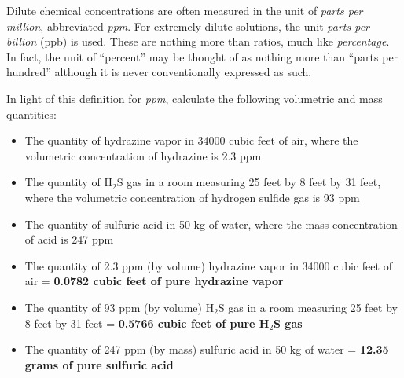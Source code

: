 

Dilute chemical concentrations are often measured in the unit of {\it parts per million}, abbreviated {\it ppm}.  For extremely dilute solutions, the unit {\it parts per billion} (ppb) is used.  These are nothing more than ratios, much like {\it percentage}.  In fact, the unit of ``percent'' may be thought of as nothing more than ``parts per hundred'' although it is never conventionally expressed as such.

\vskip 10pt

In light of this definition for {\it ppm}, calculate the following volumetric and mass quantities:

\begin{itemize}
\item{} The quantity of hydrazine vapor in 34000 cubic feet of air, where the volumetric concentration of hydrazine is 2.3 ppm
\vskip 10pt
\item{} The quantity of H$_{2}$S gas in a room measuring 25 feet by 8 feet by 31 feet, where the volumetric concentration of hydrogen sulfide gas is 93 ppm
\vskip 10pt
\item{} The quantity of sulfuric acid in 50 kg of water, where the mass concentration of acid is 247 ppm 
\end{itemize}







\begin{itemize}
\item{} The quantity of 2.3 ppm (by volume) hydrazine vapor in 34000 cubic feet of air = {\bf 0.0782 cubic feet of pure hydrazine vapor}
\vskip 10pt
\item{} The quantity of 93 ppm (by volume) H$_{2}$S gas in a room measuring 25 feet by 8 feet by 31 feet = {\bf 0.5766 cubic feet of pure H$_{2}$S gas}
\vskip 10pt
\item{} The quantity of 247 ppm (by mass) sulfuric acid in 50 kg of water = {\bf 12.35 grams of pure sulfuric acid}
\end{itemize}











